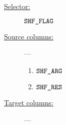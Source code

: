 \begin{description}
	\item[\underline{Selector:}] $\texttt{SHF\_FLAG}$
	\item[\underline{Source columns:}] ---
		\begin{multicols}{2}
			\begin{enumerate}
				\item $\texttt{SHF\_ARG}$
				\item $\texttt{SHF\_RES}$
			\end{enumerate}
		\end{multicols}
	\item[\underline{Target columns:}] ---
		\begin{multicols}{2}
		\begin{enumerate}
		\end{enumerate}
		\end{multicols}
\end{description}